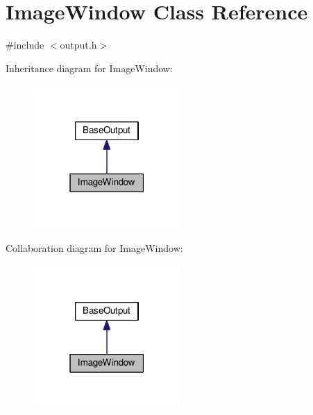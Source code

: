 \hypertarget{classImageWindow}{}\section{Image\+Window Class Reference}
\label{classImageWindow}


{\ttfamily \#include $<$output.\+h$>$}



Inheritance diagram for Image\+Window\+:
\nopagebreak
\begin{figure}[H]
\begin{center}
\leavevmode
\includegraphics[width=159pt]{classImageWindow__inherit__graph}
\end{center}
\end{figure}


Collaboration diagram for Image\+Window\+:
\nopagebreak
\begin{figure}[H]
\begin{center}
\leavevmode
\includegraphics[width=159pt]{classImageWindow__coll__graph}
\end{center}
\end{figure}
